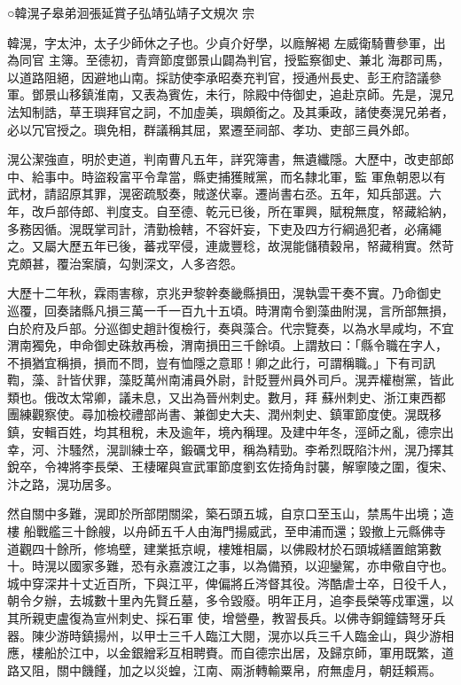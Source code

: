 
\begin{pinyinscope}

 ○韓滉子皋弟洄張延賞子弘靖弘靖子文規次
 宗



 韓滉，字太沖，太子少師休之子也。少貞介好學，以廕解褐
 左威衛騎曹參軍，出為同官
 主簿。至德初，青齊節度鄧景山闢為判官，授監察御史、兼北
 海郡司馬，以道路阻絕，因避地山南。採訪使李承昭奏充判官，授通州長史、彭王府諮議參軍。鄧景山移鎮淮南，又表為賓佐，未行，除殿中侍御史，追赴京師。先是，滉兄法知制誥，草王璵拜官之詞，不加虛美，璵頗銜之。及其秉政，諸使奏滉兄弟者，必以冗官授之。璵免相，群議稱其屈，累遷至祠部、孝功、吏部三員外郎。



 滉公潔強直，明於吏道，判南曹凡五年，詳究簿書，無遺纖隱。大歷中，改吏部郎中、給事中。時盜殺富平令韋當，縣吏捕獲賊黨，而名隸北軍，監
 軍魚朝恩以有武材，請詔原其罪，滉密疏駁奏，賊遂伏辜。遷尚書右丞。五年，知兵部選。六年，改戶部侍郎、判度支。自至德、乾元已後，所在軍興，賦稅無度，帑藏給納，多務因循。滉既掌司計，清勤檢轄，不容奸妄，下吏及四方行綱過犯者，必痛繩之。又屬大歷五年已後，蕃戎罕侵，連歲豐稔，故滉能儲積穀帛，帑藏稍實。然苛克頗甚，覆治案牘，勾剝深文，人多咨怨。



 大歷十二年秋，霖雨害稼，京兆尹黎幹奏畿縣損田，滉執雲干奏不實。乃命御史
 巡覆，回奏諸縣凡損三萬一千一百九十五頃。時渭南令劉藻曲附滉，言所部無損，白於府及戶部。分巡御史趙計復檢行，奏與藻合。代宗覽奏，以為水旱咸均，不宜渭南獨免，申命御史硃敖再檢，渭南損田三千餘頃。上謂敖曰：「縣令職在字人，不損猶宜稱損，損而不問，豈有恤隱之意耶！卿之此行，可謂稱職。」下有司訊鞫，藻、計皆伏罪，藻貶萬州南浦員外尉，計貶豐州員外司戶。滉弄權樹黨，皆此類也。俄改太常卿，議未息，又出為晉州刺史。數月，拜
 蘇州刺史、浙江東西都團練觀察使。尋加檢校禮部尚書、兼御史大夫、潤州刺史、鎮軍節度使。滉既移鎮，安輯百姓，均其租稅，未及逾年，境內稱理。及建中年冬，涇師之亂，德宗出幸，河、汴騷然，滉訓練士卒，鍛礪戈甲，稱為精勁。李希烈既陷汴州，滉乃擇其銳卒，令裨將李長榮、王棲曜與宣武軍節度劉玄佐掎角討襲，解寧陵之圍，復宋、汴之路，滉功居多。



 然自關中多難，滉即於所部閉關梁，築石頭五城，自京口至玉山，禁馬牛出境；造樓
 船戰艦三十餘艘，以舟師五千人由海門揚威武，至申浦而還；毀撤上元縣佛寺道觀四十餘所，修塢壁，建業抵京峴，樓雉相屬，以佛殿材於石頭城繕置館第數十。時滉以國家多難，恐有永嘉渡江之事，以為備預，以迎鑾駕，亦申儆自守也。城中穿深井十丈近百所，下與江平，俾偏將丘涔督其役。涔酷虐士卒，日役千人，朝令夕辦，去城數十里內先賢丘墓，多令毀廢。明年正月，追李長榮等戍軍還，以其所親吏盧復為宣州刺史、採石軍
 使，增營壘，教習長兵。以佛寺銅鐘鑄弩牙兵器。陳少游時鎮揚州，以甲士三千人臨江大閱，滉亦以兵三千人臨金山，與少游相應，樓船於江中，以金銀繒彩互相聘賚。而自德宗出居，及歸京師，軍用既繁，道路又阻，關中饑饉，加之以災蝗，江南、兩浙轉輸粟帛，府無虛月，朝廷賴焉。




\end{pinyinscope}

